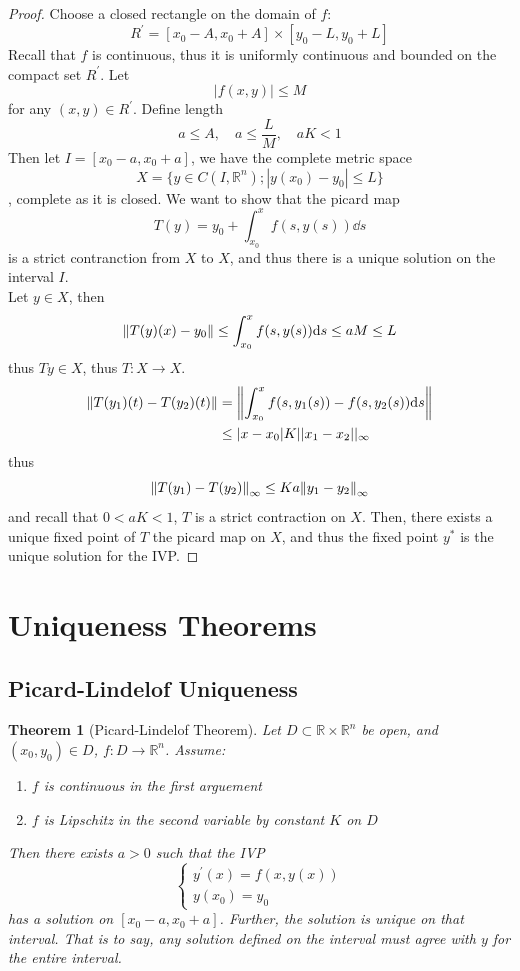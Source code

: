 \documentclass[a4paper, 12pt]{book}
\newtheorem{theorem}{Theorem}[chapter]
\begin{document}
\begin{proof}
	Choose a closed rectangle on the domain of \( f \):
	\[
		R^\prime=[x_0-A, x_0+A]\times [y_0-L, y_0+L]
	\]
	Recall that \( f \) is continuous, thus it is uniformly continuous and bounded on the compact set \( R^\prime \). Let \[
		|f(x,y)|\leq M
	\] for any \( (x,y)\in R^\prime \). Define length \[
		a\leq A, \quad a\leq \frac{ L }{ M } , \quad aK<1
	\]
	Then let \( I=[x_0-a,x_0+a] \), we have the complete metric space
	\[
		X=\{ y\in C(I, \mathbb{R}^n); |y(x_0)-y_0|\leq L\}
	\]
	, complete as it is closed. We want to show that the picard map \[
		T(y)=y_0+\int_{x_0}^{x} f(s,y(s)) \dd s
	\]
	is a strict contranction from \( X \) to \( X  \), and thus there is a unique solution on the interval \( I \). \\
	Let \( y\in X \), then \[
		\norm{T(y)(x)-y_0}\leq \int_{x_0}^{x} f(s,y(s)) \dd s \leq aM \leq L
	\]
	thus \( Ty\in X \), thus \( T:X\to X \).\\

	\begin{align*}
		\norm{T(y_1)(t)-T(y_2)(t)} & =\norm{\int_{x_0}^{x} f(s, y_1(s))-f(s, y_2(s)) \dd s} \\
		                           & \leq |x-x_0| K||x_1-x_2||_\infty
	\end{align*}
	thus \[
		\norm{T(y_1)-T(y_2)} _\infty \leq Ka \norm{y_1-y_2} _\infty
	\]
	and recall that \( 0<aK<1 \), \( T \) is a strict contraction on \( X \). Then, there exists a unique fixed point of \( T \) the picard map on \( X \), and thus the fixed point \( y^* \) is the unique solution for the IVP.
\end{proof}
\section{Uniqueness Theorems}
\subsection{Picard-Lindelof Uniqueness}
\begin{theorem}
	[Picard-Lindelof Theorem]
	Let \( D \subset \mathbb{R}\times \mathbb{R}^n\) be open, and \( (x_0,y_0) \in D\), \( f:D \to \mathbb{R}^n \). Assume:
	\begin{enumerate}
		\item \( f \) is continuous in the first arguement
		\item \(f\) is Lipschitz in the second variable by constant \( K \) on \( D \)
	\end{enumerate}
	Then there exists \( a>0 \) such that the IVP \[
		\begin{cases}
			y^\prime(x)=f(x,y(x)) \\
			y(x_0)=y_0
		\end{cases}
	\]
	has a solution on \( [x_0-a, x_0+a] \). Further, the solution is unique on that interval. That is to say, any solution defined on the interval must agree with \( y \) for the entire interval.
\end{theorem}
\end{document}
